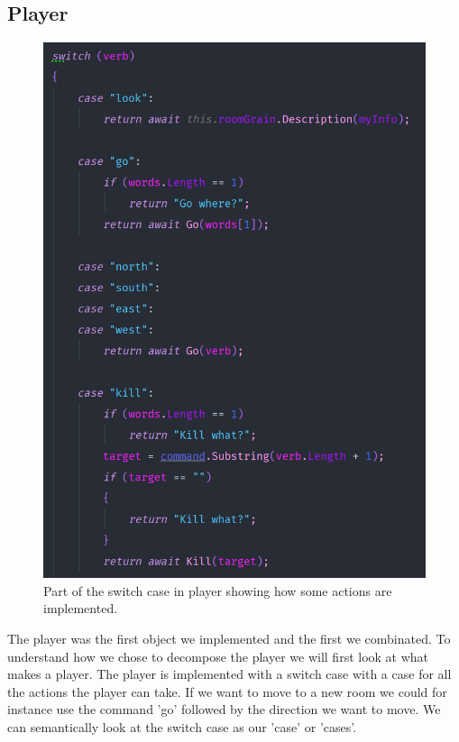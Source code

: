 \subsection{Player}
\begin{figure}
	\vspace{-10px}
	\includegraphics[width=\linewidth]{Materials/Decomposition/switchcases}
	\caption{Part of the switch case in player showing how some actions are implemented.}
\end{figure}
The player was the first object we implemented and the first we combinated. To understand how we chose to decompose the player we will first look at what makes a player. The player is implemented with a switch case with a case for all the actions the player can take. If we want to move to a new room we could for instance use the command 'go' followed by the direction we want to move. We can semantically look at the switch case as our 'case' or 'cases'.\\
